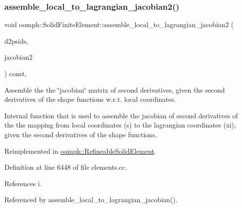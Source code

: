 \subsubsection{\texorpdfstring{assemble\+\_\+local\+\_\+to\+\_\+lagrangian\+\_\+jacobian2()}{assemble\_local\_to\_lagrangian\_jacobian2()}}
{\footnotesize\ttfamily void oomph\+::\+Solid\+Finite\+Element\+::assemble\+\_\+local\+\_\+to\+\_\+lagrangian\+\_\+jacobian2 (\begin{DoxyParamCaption}\item[{const \hyperlink{classoomph_1_1DShape}{D\+Shape} \&}]{d2psids,  }\item[{\hyperlink{classoomph_1_1DenseMatrix}{Dense\+Matrix}$<$ double $>$ \&}]{jacobian2 }\end{DoxyParamCaption}) const\hspace{0.3cm}{\ttfamily [private]}, {\ttfamily [virtual]}}



Assemble the the \char`\"{}jacobian\char`\"{} matrix of second derivatives, given the second derivatives of the shape functions w.\+r.\+t. local coordinates. 

Internal function that is used to assemble the jacobian of second derivatives of the the mapping from local coordinates (s) to the lagrangian coordinates (xi), given the second derivatives of the shape functions. 

Reimplemented in \hyperlink{classoomph_1_1RefineableSolidElement_a5843ecc4836508342150862e11af99f4}{oomph\+::\+Refineable\+Solid\+Element}.



Definition at line 6448 of file elements.\+cc.



References i.



Referenced by assemble\+\_\+local\+\_\+to\+\_\+lagrangian\+\_\+jacobian().

\mbox{\label{classoomph_1_1SolidFiniteElement_ab48f9adb99fd89669434984733579a26}} 
